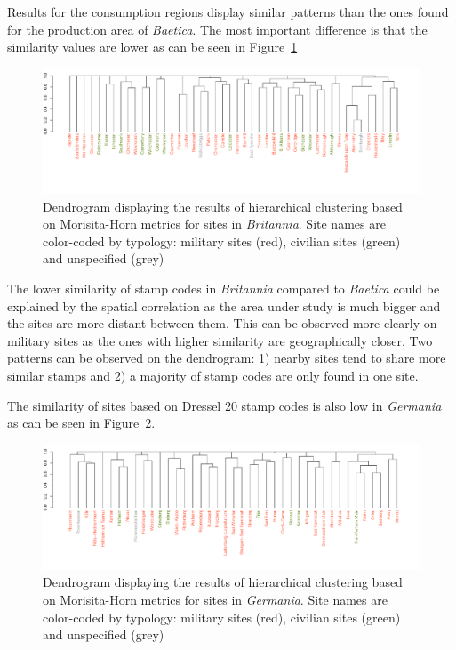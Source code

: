\documentclass[review]{elsarticle}
\begin{document}
Results for the consumption regions display similar patterns than the ones found for the production area of \textit{Baetica}. The most important difference is that the similarity values are lower as can be seen in Figure~\ref{britmap}


\begin{figure}
	\centering
\includegraphics[angle=180,width=\linewidth]{figs/dendrobrit5.pdf}
\caption{Dendrogram displaying the results of hierarchical clustering based on Morisita-Horn metrics for sites in \textit{Britannia}. Site names are color-coded by typology: military sites (red), civilian sites (green) and unspecified (grey)}
\label{britmap}
\end{figure}

The lower similarity of stamp codes in \textit{Britannia} compared to \textit{Baetica} could be explained by the spatial correlation as the area under study is much bigger and the sites are more distant between them. This can be observed more clearly on military sites as the ones with higher similarity are geographically closer. Two patterns can be observed on the dendrogram: 1) nearby sites tend to share more similar stamps and 2) a majority of stamp codes are only found in one site.
 
The similarity of sites based on Dressel 20 stamp codes is also low in \textit{Germania} as can be seen in Figure~\ref{germap}. 

\begin{figure}
	\centering
\includegraphics[angle=180, width=\linewidth]{figs/dendroger5.pdf}
\caption{Dendrogram displaying the results of hierarchical clustering based on Morisita-Horn metrics for sites in \textit{Germania}. Site names are color-coded by typology: military sites (red), civilian sites (green) and unspecified (grey)}
\label{germap}
\end{figure}
\end{document}
